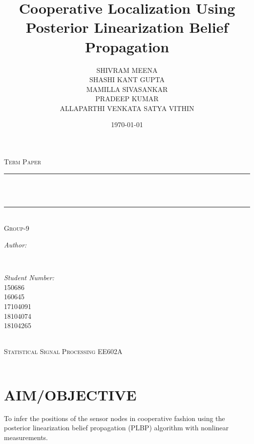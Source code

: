 \documentclass[12pt]{article}
\title{Cooperative Localization Using Posterior Linearization Belief Propagation}								%
\author{SHIVRAM MEENA\\
		SHASHI KANT GUPTA \\
		MAMILLA SIVASANKAR \\
		PRADEEP KUMAR \\
		ALLAPARTHI VENKATA SATYA VITHIN \\}								%
\date{\today}											%
\makeatletter
\let\thetitle\@title
\let\theauthor\@author
\let\thedate\@date
\makeatother
\begin{document}

\begin{titlepage}
	\centering
    \vspace*{0.5 cm}

	\textsc{\Large Term Paper}\\[0.5 cm]				%
	\rule{\linewidth}{0.2 mm} \\[0.4 cm]
	{ \huge  \thetitle}\\
	\rule{\linewidth}{0.2 mm} \\[4 cm]
	\textsc{\large Group-9}\\[0.5 cm]
	\begin{minipage}{0.7\textwidth}
		\begin{flushleft} \large
			\emph{Author:}\\
			\theauthor
			\end{flushleft}
			\end{minipage}~
			\begin{minipage}{0.4\textwidth}
			\begin{flushright} \large
			\emph{Student Number:} \\
			150686 \\
160645 \\
17104091 \\
18104074 \\
18104265\\							%
		\end{flushright}
	\end{minipage}\\[2 cm]
	\textsc{\large Statistical Signal Processing EE602A}\\[0.5 cm]
	{\large \thedate}\\[2 cm]

	\vfill

\end{titlepage}


\tableofcontents
\pagebreak


\section{AIM/OBJECTIVE}
  To infer the positions of the sensor nodes in cooperative fashion using the posterior linearization belief propagation (PLBP) algorithm with nonlinear measurements.
\end{document}
